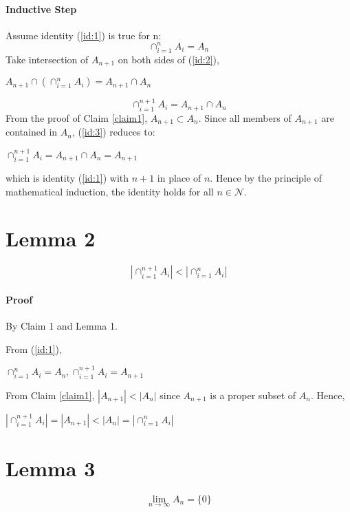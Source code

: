 \documentclass[14pt]{extarticle}
\begin{document}
	\paragraph{Inductive Step} Assume identity (\ref{id:1}) is true for n:
	\begin{equation}\label{id:2}
	\cap_{i=1}^n A_i= A_n
	\end{equation}
	Take intersection of $A_{n+1}$ on both sides of (\ref{id:2}),
	\begin{center}
	$A_{n+1} \cap (\cap_{i=1}^n A_i)= A_{n+1} \cap A_n$
	\end{center}
	\begin{equation}\label{id:3}
	\cap_{i=1}^{n+1} A_i = A_{n+1} \cap A_n
	\end{equation}
	From the proof of Claim \ref{claim1}, $A_{n+1} \subset A_n$.  Since all members of $A_{n+1}$ are contained in $A_n$, (\ref{id:3}) reduces to:
	\begin{center}
	$\cap_{i=1}^{n+1} A_i= A_{n+1} \cap A_n = A_{n+1}$	
	\end{center} 
	which is identity (\ref{id:1}) with $n+1$ in place of $n$.  Hence by the principle of mathematical induction, the identity holds for all $n \in \mathcal{N}$.
	\section{Lemma 2}
	\begin{equation}\label{lemma2}
	|\cap_{i=1}^{n+1} A_i| < |\cap_{i=1}^n A_i|
	\end{equation}
	\paragraph{Proof} By Claim 1 and Lemma 1.
	\par\bigskip
	From (\ref{id:1}),
	\begin{center}
		$\cap_{i=1}^n A_i = A_n, \cap_{i=1}^{n+1} A_i = A_{n+1}$	
	\end{center} 
	From Claim \ref{claim1}, $|A_{n+1}| < |A_n|$ since $A_{n+1}$ is a proper subset of $A_n$.  Hence,
	\begin{center}
	 $|\cap_{i=1}^{n+1} A_i| = |A_{n+1}| < |A_n| = |\cap_{i=1}^n A_i|$
	\end{center} 
	\section{Lemma 3}
	\begin{equation}\label{lemma3}
	\lim\limits_{n \to \infty} A_n = \{0\}
	\end{equation}
\end{document}
